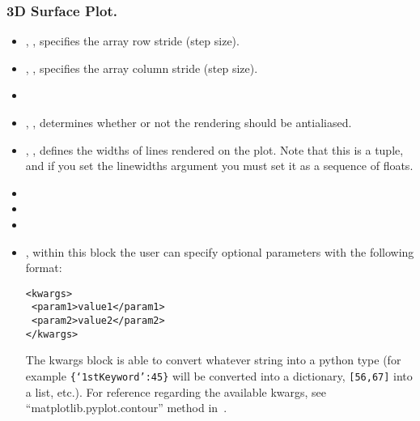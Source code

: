 \subsubsection{3D Surface Plot.}
\begin{itemize}
  \item {}, , specifies the
  array row stride (step size).
  \item {}, , specifies the 
  array column stride (step size).
  \item {}
  \item {}, , determines
  whether or not the rendering should be antialiased.
  \item {}, , defines the 
  widths of lines rendered on the plot.
  Note that this is a tuple, and if you set the linewidths argument you must set
  it as a sequence of floats. 
  \item {}
  \item {}
  \item {}
  \item {}, within this block the user can specify optional
  parameters with the following format:

\begin{lstlisting}[style=XML]
<kwargs>
 <param1>value1</param1>
 <param2>value2</param2>
</kwargs>
\end{lstlisting}

  The kwargs block is able to convert whatever string into a python type (for
  example \texttt{\{`1stKeyword':45\}} will
  be converted into a dictionary, 
  \texttt{[56,67]} into a list, etc.).
  For reference regarding the available kwargs, see
  ``matplotlib.pyplot.contour'' method in~\cite{MatPlotLib}.
\end{itemize}

